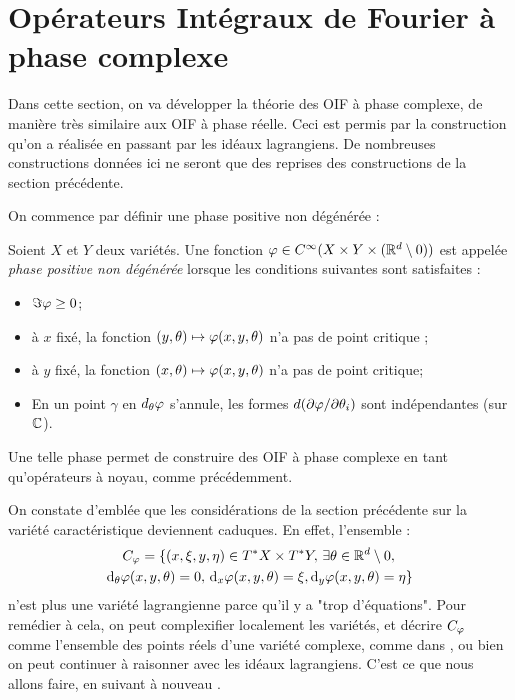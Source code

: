 \section{Opérateurs Intégraux de Fourier à phase complexe}
Dans cette section, on va développer la théorie des OIF à phase complexe, de manière très similaire aux OIF à phase réelle. Ceci est permis par la construction qu'on a réalisée en passant par les idéaux lagrangiens. De nombreuses constructions données ici ne seront que des reprises des constructions de la section précédente.

On commence par définir une phase positive non dégénérée :
\begin{defn}
	Soient $X$ et $Y$ deux variétés. Une fonction $\varphi \in C^{\infty}(X\times Y \times (\mathbb{R}^d\setminus 0))$ est appelée \emph{phase positive non dégénérée} lorsque les conditions suivantes sont satisfaites :
	\begin{itemize}
		\item $\Im \varphi \geq 0$;
		\item à $x$ fixé, la fonction $(y,\theta) \mapsto \varphi(x,y,\theta)$ n'a pas de point critique ;
		\item à $y$ fixé, la fonction $(x,\theta) \mapsto \varphi(x,y,\theta)$ n'a pas de point critique; 
		\item En un point $\gamma$ en $d_{\theta}\varphi$ s'annule, les formes $d(\partial \varphi/\partial \theta_i)$ sont indépendantes (sur $\mathbb{C}$).
	\end{itemize}
\end{defn}

Une telle phase permet de construire des OIF à phase complexe en tant qu'opérateurs à noyau, comme précédemment.

On constate d'emblée que les considérations de la section précédente sur la variété caractéristique deviennent caduques. En effet, l'ensemble :
\begin{multline*}
C_{\varphi}=\{(x,\xi,y,\eta) \in T^*X \times T^*Y,\,\exists \theta\in \mathbb{R}^d\setminus 0,\,\\\mathrm{d}_{\theta}\varphi(x,y,\theta)=0,\,\mathrm{d}_x\varphi(x,y,\theta)=\xi, \mathrm{d}_y\varphi(x,y,\theta)=\eta\}
\end{multline*}
n'est plus une variété lagrangienne parce qu'il y a "trop d'équations". Pour remédier à cela, on peut complexifier localement les variétés, et décrire $C_{\varphi}$ comme l'ensemble des points réels d'une variété complexe, comme dans \cite{Melin1975fourier}, ou bien on peut continuer à raisonner avec les idéaux lagrangiens. C'est ce que nous allons faire, en suivant à nouveau \cite{hormander1985}.

